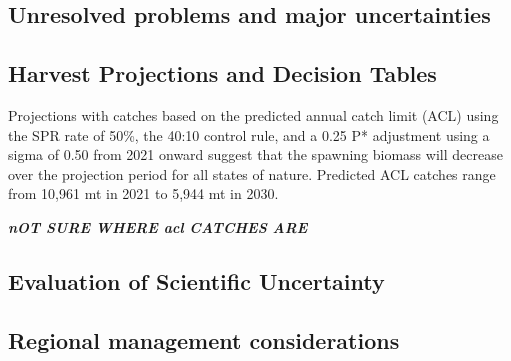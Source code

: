 \documentclass[
]{scrartcl}
\newenvironment{Shaded}{\begin{snugshade}}{\end{snugshade}}
\newcommand{\AttributeTok}[1]{\textcolor[rgb]{0.40,0.45,0.13}{#1}}
\newcommand{\DecValTok}[1]{\textcolor[rgb]{0.68,0.00,0.00}{#1}}
\newcommand{\FunctionTok}[1]{\textcolor[rgb]{0.28,0.35,0.67}{#1}}
\newcommand{\NormalTok}[1]{\textcolor[rgb]{0.00,0.23,0.31}{#1}}
\newcommand{\OtherTok}[1]{\textcolor[rgb]{0.00,0.23,0.31}{#1}}
\newcommand{\SpecialCharTok}[1]{\textcolor[rgb]{0.37,0.37,0.37}{#1}}
\newcommand{\StringTok}[1]{\textcolor[rgb]{0.13,0.47,0.30}{#1}}
\begin{document}
\subsection{Unresolved problems and major
uncertainties}\label{unresolved-problems-and-major-uncertainties-1}

\subsection{Harvest Projections and Decision
Tables}\label{harvest-projections-and-decision-tables}

\begin{Shaded}
\end{Shaded}

Projections with catches based on the predicted annual catch limit (ACL)
using the SPR rate of 50\%, the 40:10 control rule, and a 0.25 P*
adjustment using a sigma of 0.50 from 2021 onward suggest that the
spawning biomass will decrease over the projection period for all states
of nature. Predicted ACL catches range from 10,961 mt in 2021 to 5,944
mt in 2030.

\textbf{\emph{nOT SURE WHERE acl CATCHES ARE }}

\subsection{Evaluation of Scientific
Uncertainty}\label{evaluation-of-scientific-uncertainty}

\subsection{Regional management
considerations}\label{regional-management-considerations}
\end{document}

